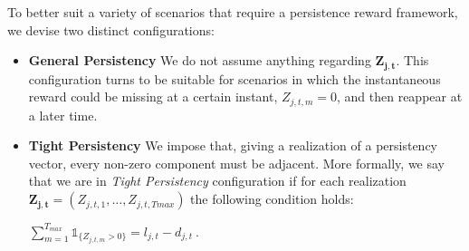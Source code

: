 To better suit a variety of scenarios that require a persistence reward framework, we devise two distinct configurations:
\begin{itemize}
	\item \textbf{General Persistency} We do not assume anything regarding $\boldsymbol{Z_{j,t}}$. This configuration turns to be suitable for scenarios in which the instantaneous reward could be missing at a certain instant, $Z_{j,t,m} =0$, and then reappear at a later time. 
	
	\item \textbf{Tight Persistency} We impose that, giving a realization of a persistency vector, every non-zero component must be adjacent. More formally, we say that we are in \emph{Tight Persistency} configuration if for each realization $\boldsymbol{Z_{j,t}}= (Z_{j,t,1},\dots, Z_{j,t,Tmax})$ the following condition holds:
	
	\begin{center}
		
		$\sum_{m=1}^{T_{max}}\mathds{1}_{\{Z_{j,t,m}>0\}} = l_{j,t}-d_{j,t} \ .$

	
	\end{center}
\end{itemize}








